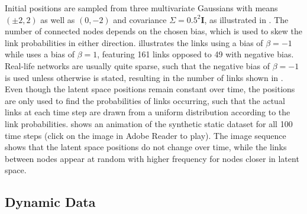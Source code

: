     Initial positions are sampled from three multivariate Gaussians with means $(\pm2,2)$ as well as $(0,-2)$ and covariance $\Sigma=0.5^2\bm{I}$, as illustrated in . 
    The number of connected nodes depends on the chosen bias, which is used to skew the link probabilities in either direction.  illustrates the links using a bias of $\beta=-1$ while  uses a bias of $\beta=1$, featuring 161 links opposed to 49 with negative bias.
    Real-life networks are usually quite sparse, such that the negative bias of $\beta=-1$ is used unless otherwise is stated, resulting in the number of links shown in . Even though the latent space positions remain constant over time, the positions are only used to find the probabilities of links occurring, such that the actual links at each time step are drawn from a uniform distribution according to the link probabilities.
     shows an animation of the synthetic static dataset for all 100 time steps (click on the image in Adobe Reader to play). The image sequence shows that the latent space positions do not change over time, while the links between nodes appear at random with higher frequency for nodes closer in latent space.

\subsection{Dynamic Data}

